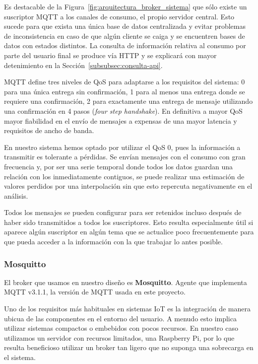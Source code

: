 \documentclass[a4paper,10pt]{article}
\begin{document}
Es destacable de la Figura~\ref{fig:arquitectura_broker_sistema} que
sólo existe un suscriptor MQTT a los canales de consumo, el propio
servidor central. Esto sucede para que exista una única base de datos
centralizada y evitar problemas de inconsistencia en caso de que algún
cliente se caiga y se encuentren bases de datos con estados
distintos. La consulta de información relativa al consumo por parte
del usuario final se produce vía HTTP y se explicará con mayor
detenimiento en la Sección~\ref{subsubsec:consulta-api}.

MQTT define tres niveles de QoS para adaptarse a los requisitos del
sistema: 0 para una única entrega sin confirmación, 1 para al menos
una entrega donde se requiere una confirmación, 2 para exactamente una
entrega de mensaje utilizando una confirmación en 4 pasos
(\textit{four step handshake}). En definitiva a mayor QoS mayor
fiabilidad en el envío de mensajes a expensas de una mayor latencia y
requisitos de ancho de banda.

En nuestro sistema hemos optado por utilizar el QoS 0, pues la
información a transmitir es tolerante a pérdidas. Se envían mensajes
con el consumo con gran frecuencia y, por ser una serie temporal donde
todos los datos guardan una relación con los inmediatamente contiguos,
se puede realizar una estimación de valores perdidos por una
interpolación sin que esto repercuta negativamente en el análisis.

Todos los mensajes se pueden configurar para ser retenidos incluso
después de haber sido transmitidos a todos los suscriptores. Esto
resulta especialmente útil si aparece algún suscriptor en algún tema
que se actualice poco frecuentemente para que pueda acceder a la
información con la que trabajar lo antes posible.


\newpage

\subsubsection{Mosquitto}\label{subsubsec:broker_mosquitto}

El broker que usamos en nuestro diseño es
\textbf{Mosquitto}\cite{EclipseMosquitto}. Agente que implementa MQTT
v3.1.1, la versión de MQTT usada en este proyecto.

Uno de los requisitos más habituales en sistemas IoT es la integración
de manera ubicua de las componentes en el entorno del usuario. A
menudo esto implica utilizar sistemas compactos o embebidos con pocos
recursos. En nuestro caso utilizamos un servidor con recursos
limitados, una Raspberry Pi, por lo que resulta beneficioso utilizar
un broker tan ligero que no suponga una sobrecarga en el sistema.
\end{document}

